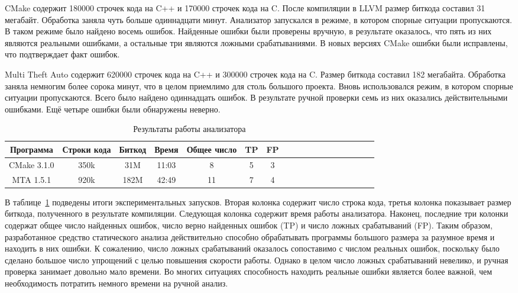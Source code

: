 CMake содержит 180000 строчек кода на C++ и 170000 строчек кода на
C. После компиляции в LLVM размер биткода составил 31
мегабайт. Обработка заняла чуть больше одиннадцати минут. Анализатор
запускался в режиме, в котором спорные ситуации пропускаются. В таком
режиме было найдено восемь ошибок. Найденные ошибки были проверены
вручную, в результате оказалось, что пять из них являются реальными
ошибками, а остальные три являются ложными срабатываниями. В новых
версиях CMake ошибки были исправлены, что подтверждает факт ошибок.

Multi Theft Auto содержит 620000 строчек кода на C++ и 300000 строчек
кода на C. Размер биткода составил 182 мегабайта. Обработка заняла
немногим более сорока минут, что в целом приемлимо для столь большого
проекта. Вновь использовался режим, в котором спорные ситуации
пропускаются. Всего было найдено одиннадцать ошибок. В результате
ручной проверки семь из них оказались действительными ошибками. Ещё
четыре ошибки были обнаружены неверно.

\begin{table}[!h]
\caption{Результаты работы анализатора}\label{tab:analyzer-results}
\centering
  \begin{tabular}{|*{18}{c|}}\hline
  Программа   & Строки кода & Биткод & Время & Общее число & TP & FP \\\hline
  CMake 3.1.0 & 350k        & 31M    & 11:03 & 8           & 5  & 3  \\\hline
  MTA 1.5.1   & 920k        & 182M   & 42:49 & 11          & 7  & 4  \\\hline
  \end{tabular}
\end{table}

В таблице~\ref{tab:analyzer-results} подведены итоги экспериментальных
запусков. Вторая колонка содержит число строка кода, третья колонка
показывает размер биткода, полученного в результате
компиляции. Следующая колонка содержит время работы
анализатора. Наконец, последние три колонки содержат общее число
найденных ошибок, число верно найденных ошибок (TP) и число ложных
срабатываний (FP). Таким образом, разработанное средство статического
анализа действительно способно обрабатывать программы большого размера
за разумное время и находить в них ошибки. К сожалению, число ложных
срабатываний оказалось сопоставимо с числом реальных ошибок, поскольку
было сделано большое число упрощений с целью повышения скорости
работы. Однако в целом число ложных срабатываний невелико, и ручная
проверка занимает довольно мало времени. Во многих ситуациях
способность находить реальные ошибки является более важной, чем
необходимость потратить немного времени на ручной анализ.

